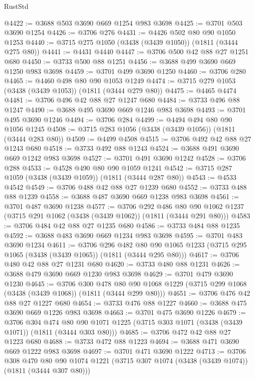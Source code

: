 \begin{lexlean}{RustStd}
\begin{coremodule}
@4422 := @3688 @503 @3690 @669 @1254 @983 @3698
@4425 := @3701 @503 @3690 @1254
@4426 := @3706 @276
@4431 := @4426 @502 @80 @90 @1050 @1253
@4440 := @3715 @275 @1050 (@3438 (@3439 @1050)) (@1811 (@3444 @275 @80))
@4441 := @4431 @4440
@4447 := @3706 @500 @42 @88 @27 @1251 @680
@4450 := @3733 @500 @88 @1251
@4456 := @3688 @499 @3690 @669 @1250 @983 @3698
@4459 := @3701 @499 @3690 @1250
@4460 := @3706 @280
@4465 := @4460 @498 @80 @90 @1053 @1249
@4474 := @3715 @279 @1053 (@3438 (@3439 @1053)) (@1811 (@3444 @279 @80))
@4475 := @4465 @4474
@4481 := @3706 @496 @42 @88 @27 @1247 @680
@4484 := @3733 @496 @88 @1247
@4490 := @3688 @495 @3690 @669 @1246 @983 @3698
@4493 := @3701 @495 @3690 @1246
@4494 := @3706 @284
@4499 := @4494 @494 @80 @90 @1056 @1245
@4508 := @3715 @283 @1056 (@3438 (@3439 @1056)) (@1811 (@3444 @283 @80))
@4509 := @4499 @4508
@4515 := @3706 @492 @42 @88 @27 @1243 @680
@4518 := @3733 @492 @88 @1243
@4524 := @3688 @491 @3690 @669 @1242 @983 @3698
@4527 := @3701 @491 @3690 @1242
@4528 := @3706 @288
@4533 := @4528 @490 @80 @90 @1059 @1241
@4542 := @3715 @287 @1059 (@3438 (@3439 @1059)) (@1811 (@3444 @287 @80))
@4543 := @4533 @4542
@4549 := @3706 @488 @42 @88 @27 @1239 @680
@4552 := @3733 @488 @88 @1239
@4558 := @3688 @487 @3690 @669 @1238 @983 @3698
@4561 := @3701 @487 @3690 @1238
@4577 := @3706
    @292
    @486
    @80
    @90
    @1062
    @1237
    (@3715 @291 @1062 (@3438 (@3439 @1062)) (@1811 (@3444 @291 @80)))
@4583 := @3706 @484 @42 @88 @27 @1235 @680
@4586 := @3733 @484 @88 @1235
@4592 := @3688 @483 @3690 @669 @1234 @983 @3698
@4595 := @3701 @483 @3690 @1234
@4611 := @3706
    @296
    @482
    @80
    @90
    @1065
    @1233
    (@3715 @295 @1065 (@3438 (@3439 @1065)) (@1811 (@3444 @295 @80)))
@4617 := @3706 @480 @42 @88 @27 @1231 @680
@4620 := @3733 @480 @88 @1231
@4626 := @3688 @479 @3690 @669 @1230 @983 @3698
@4629 := @3701 @479 @3690 @1230
@4645 := @3706
    @300
    @478
    @80
    @90
    @1068
    @1229
    (@3715 @299 @1068 (@3438 (@3439 @1068)) (@1811 (@3444 @299 @80)))
@4651 := @3706 @476 @42 @88 @27 @1227 @680
@4654 := @3733 @476 @88 @1227
@4660 := @3688 @475 @3690 @669 @1226 @983 @3698
@4663 := @3701 @475 @3690 @1226
@4679 := @3706
    @304
    @474
    @80
    @90
    @1071
    @1225
    (@3715 @303 @1071 (@3438 (@3439 @1071)) (@1811 (@3444 @303 @80)))
@4685 := @3706 @472 @42 @88 @27 @1223 @680
@4688 := @3733 @472 @88 @1223
@4694 := @3688 @471 @3690 @669 @1222 @983 @3698
@4697 := @3701 @471 @3690 @1222
@4713 := @3706
    @308
    @470
    @80
    @90
    @1074
    @1221
    (@3715 @307 @1074 (@3438 (@3439 @1074)) (@1811 (@3444 @307 @80)))

\end{coremodule}
\end{lexlean}
